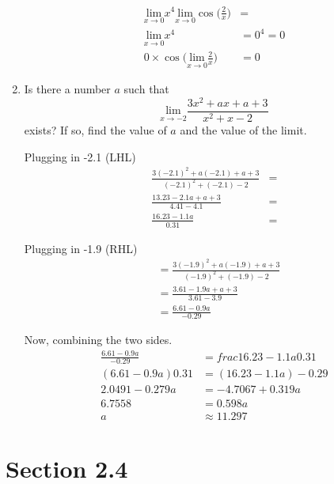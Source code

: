 \documentclass{article}
\begin{document}
\begin{enumerate}
	$$\begin{align}\underset{x\rightarrow 0}{\text{lim}}x^4 \underset{x\rightarrow 0}{\text{lim}}\cos\Big(\frac{2}{x}\Big) &= \\
	\underset{x\rightarrow 0}{\text{lim}}x^4 &= 0^4 = 0 \\
	0 \times \cos\Big(\underset{x\rightarrow 0}{\text{lim}}\frac{2}{x}\Big) &= \boxed{0}
	\end{align}$$
\setcounter{enumi}{48}
	\item Is there a number $a$ such that $$\underset{x\rightarrow -2}{\text{lim}}\frac{3x^2+ax+a+3}{x^2+x-2}$$ exists? If so, find the value of $a$ and the value of the limit.
	\begin{center}
	\begin{minipage}[t]{.5\textwidth}
	Plugging in -2.1 (LHL)
	$$\begin{align}
	\frac{3(-2.1)^2+a(-2.1)+a+3}{(-2.1)^2+(-2.1)-2} &=\\
	\frac{13.23-2.1a+a+3}{4.41-4.1} &= \\
	\frac{16.23-1.1a}{0.31} &=
	\end{align}$$
	\end{minipage}%
	\begin{minipage}[t]{.5\textwidth}
	Plugging in -1.9 (RHL)
	$$\begin{align}
	&= \frac{3(-1.9)^2+a(-1.9)+a+3}{(-1.9)^2+(-1.9)-2}\\
	&= \frac{3.61-1.9a+a+3}{3.61-3.9} \\
	&= \frac{6.61-0.9a}{-0.29}
	\end{align}$$
	\end{minipage}
	\end{center}
	Now, combining the two sides.
	$$\begin{align}
	\frac{6.61-0.9a}{-0.29} &= frac{16.23-1.1a}{0.31}\\
	(6.61-0.9a)0.31 &= (16.23-1.1a)-0.29 \\
	2.0491 - 0.279a &= -4.7067 + 0.319a \\
	6.7558 &= 0.598a \\
	a &\approx \boxed{11.297}
	\end{align}$$
\end{enumerate}

\section{Section 2.4}
\end{document}
